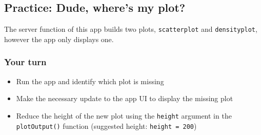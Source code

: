 \documentclass[
  letterpaper,
  DIV=11,
  numbers=noendperiod]{scrreprt}
\newenvironment{Shaded}{\begin{snugshade}}{\end{snugshade}}
\newcommand{\AttributeTok}[1]{\textcolor[rgb]{0.40,0.46,0.14}{#1}}
\newcommand{\CommentTok}[1]{\textcolor[rgb]{0.37,0.37,0.37}{#1}}
\newcommand{\ControlFlowTok}[1]{\textcolor[rgb]{0.00,0.46,0.62}{#1}}
\newcommand{\FunctionTok}[1]{\textcolor[rgb]{0.28,0.35,0.67}{#1}}
\newcommand{\NormalTok}[1]{\textcolor[rgb]{0.00,0.46,0.62}{#1}}
\newcommand{\OtherTok}[1]{\textcolor[rgb]{0.00,0.46,0.62}{#1}}
\newcommand{\SpecialCharTok}[1]{\textcolor[rgb]{0.37,0.37,0.37}{#1}}
\newcommand{\StringTok}[1]{\textcolor[rgb]{0.13,0.47,0.30}{#1}}
\providecommand{\tightlist}{%
  \setlength{\itemsep}{0pt}\setlength{\parskip}{0pt}}
\begin{document}
\begin{Shaded}
\end{Shaded}

\hypertarget{practice-dude-wheres-my-plot}{%
\subsection{Practice: Dude, where's my
plot?}\label{practice-dude-wheres-my-plot}}

The server function of this app builds two plots, \texttt{scatterplot}
and \texttt{densityplot}, however the app only displays one.

\hypertarget{your-turn-9}{%
\subsubsection{Your turn}\label{your-turn-9}}

\begin{itemize}
\tightlist
\item
  Run the app and identify which plot is missing
\item
  Make the necessary update to the app UI to display the missing plot
\item
  Reduce the height of the new plot using the \texttt{height} argument
  in the \texttt{plotOutput()} function (suggested height:
  \texttt{height\ =\ 200})
\end{itemize}
\end{document}
